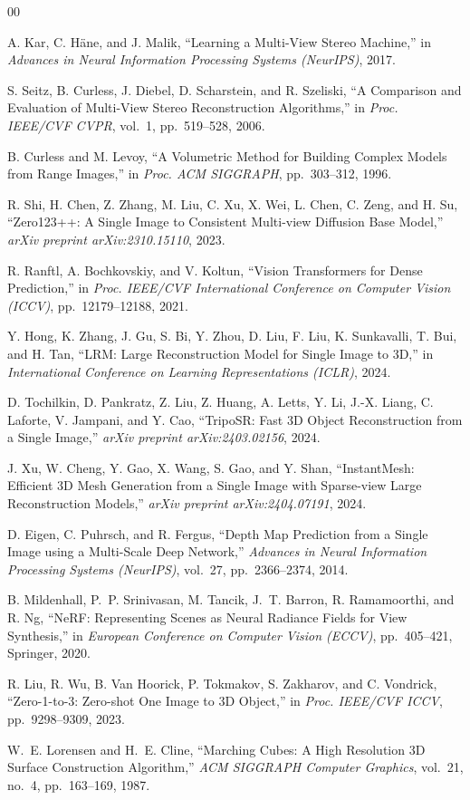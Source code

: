\documentclass[conference]{IEEEtran}
\begin{document}
\begin{thebibliography}{00}

A. Kar, C. Häne, and J. Malik,
``Learning a Multi-View Stereo Machine,''
in \textit{Advances in Neural Information Processing Systems (NeurIPS)}, 2017.

S. Seitz, B. Curless, J. Diebel, D. Scharstein, and R. Szeliski,
``A Comparison and Evaluation of Multi-View Stereo Reconstruction Algorithms,''
in \textit{Proc. IEEE/CVF CVPR}, vol.~1, pp.~519--528, 2006.

B. Curless and M. Levoy,
``A Volumetric Method for Building Complex Models from Range Images,''
in \textit{Proc. ACM SIGGRAPH}, pp.~303--312, 1996.

R. Shi, H. Chen, Z. Zhang, M. Liu, C. Xu, X. Wei, L. Chen, C. Zeng, and H. Su,
``Zero123++: A Single Image to Consistent Multi-view Diffusion Base Model,''
\textit{arXiv preprint arXiv:2310.15110}, 2023.

R. Ranftl, A. Bochkovskiy, and V. Koltun, ``Vision Transformers for Dense Prediction,''
in \textit{Proc. IEEE/CVF International Conference on Computer Vision (ICCV)}, pp.~12179--12188, 2021.

Y. Hong, K. Zhang, J. Gu, S. Bi, Y. Zhou, D. Liu, F. Liu, K. Sunkavalli, T. Bui, and H. Tan,
``LRM: Large Reconstruction Model for Single Image to 3D,''
in \textit{International Conference on Learning Representations (ICLR)}, 2024.

D. Tochilkin, D. Pankratz, Z. Liu, Z. Huang, A. Letts, Y. Li, J.-X. Liang, C. Laforte, V. Jampani,
and Y. Cao,
``TripoSR: Fast 3D Object Reconstruction from a Single Image,''
\textit{arXiv preprint arXiv:2403.02156}, 2024.

J. Xu, W. Cheng, Y. Gao, X. Wang, S. Gao, and Y. Shan,
``InstantMesh: Efficient 3D Mesh Generation from a Single Image with Sparse-view Large Reconstruction Models,''
\textit{arXiv preprint arXiv:2404.07191}, 2024.

D. Eigen, C. Puhrsch, and R. Fergus, ``Depth Map Prediction from a Single Image using a Multi-Scale Deep Network,''
\textit{Advances in Neural Information Processing Systems (NeurIPS)}, vol.~27, pp.~2366--2374, 2014.

B. Mildenhall, P.~P. Srinivasan, M. Tancik, J.~T. Barron, R. Ramamoorthi, and R. Ng,
``NeRF: Representing Scenes as Neural Radiance Fields for View Synthesis,''
in \textit{European Conference on Computer Vision (ECCV)}, pp.~405--421, Springer, 2020.

R. Liu, R. Wu, B. Van Hoorick, P. Tokmakov, S. Zakharov, and C. Vondrick,
``Zero-1-to-3: Zero-shot One Image to 3D Object,''
in \textit{Proc. IEEE/CVF ICCV}, pp.~9298--9309, 2023.

W.~E. Lorensen and H.~E. Cline,
``Marching Cubes: A High Resolution 3D Surface Construction Algorithm,''
\textit{ACM SIGGRAPH Computer Graphics}, vol.~21, no.~4, pp.~163--169, 1987.

\end{thebibliography}
\end{document}
